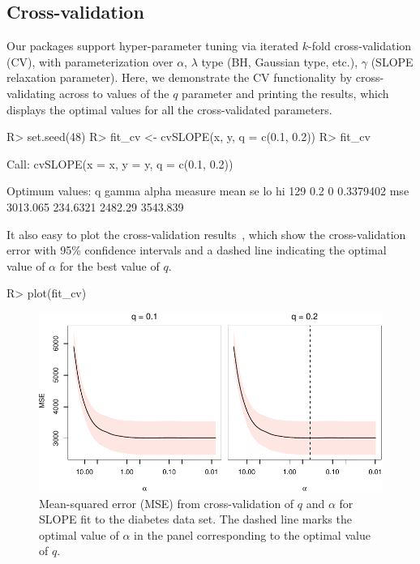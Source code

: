 \documentclass[article]{jss}
\makeatletter
\let\Cref\crtCref
\let\natwidth\Gin@nat@width
\makeatother
\begin{document}
\subsection{Cross-validation}

Our packages support hyper-parameter tuning via iterated \(k\)-fold
cross-validation (CV), with parameterization over \(\alpha\), \(\lambda\) type (BH,
Gaussian type, etc.), \(\gamma\) (SLOPE relaxation parameter).
Here, we demonstrate the CV functionality by cross-validating across
to values of the \(q\) parameter and printing the results,
which displays the optimal values for all the cross-validated parameters.

\begin{CodeChunk}
  \begin{CodeInput}
R> set.seed(48)
R> fit_cv <- cvSLOPE(x, y, q = c(0.1, 0.2))
R> fit_cv
\end{CodeInput}
  \begin{CodeOutput}
Call:
cvSLOPE(x = x, y = y, q = c(0.1, 0.2))

Optimum values:
      q gamma     alpha measure     mean       se      lo       hi
129 0.2     0 0.3379402     mse 3013.065 234.6321 2482.29 3543.839
\end{CodeOutput}
\end{CodeChunk}

It also easy to plot the cross-validation results~\Cref{fig:cv}, which
show the cross-validation error with 95\% confidence intervals and
a dashed line indicating the optimal value of \(\alpha\) for the
best value of \(q\).

\begin{Code}
R> plot(fit_cv)
\end{Code}

\begin{figure}[tp]
  \centering
  \includegraphics[width=\natwidth]{images/slope-cv.pdf}
  \caption{%
    Mean-squared error (MSE) from cross-validation of
    \(q\) and \(\alpha\) for SLOPE fit to the diabetes data set.
    The dashed line marks the optimal value of \(\alpha\) in the
    panel corresponding to the optimal value of \(q\).
  }
  \label{fig:cv}
\end{figure}
\end{document}

